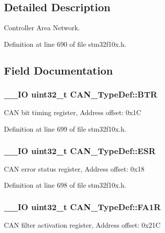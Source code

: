 \subsection{Detailed Description}
Controller Area Network. 

Definition at line 690 of file stm32f10x.\-h.



\subsection{Field Documentation}
\hypertarget{struct_c_a_n___type_def_accad1e4155459a13369f5ad0e7c6da29}{
\subsubsection[{B\-T\-R}]{\setlength{\rightskip}{0pt plus 5cm}\-\_\-\-\_\-\-I\-O {\bf uint32\-\_\-t} C\-A\-N\-\_\-\-Type\-Def\-::\-B\-T\-R}}\label{struct_c_a_n___type_def_accad1e4155459a13369f5ad0e7c6da29}
C\-A\-N bit timing register, Address offset\-: 0x1\-C 

Definition at line 699 of file stm32f10x.\-h.

\hypertarget{struct_c_a_n___type_def_ab1a1b6a7c587443a03d654d3b9a94423}{
\subsubsection[{E\-S\-R}]{\setlength{\rightskip}{0pt plus 5cm}\-\_\-\-\_\-\-I\-O {\bf uint32\-\_\-t} C\-A\-N\-\_\-\-Type\-Def\-::\-E\-S\-R}}\label{struct_c_a_n___type_def_ab1a1b6a7c587443a03d654d3b9a94423}
C\-A\-N error status register, Address offset\-: 0x18 

Definition at line 698 of file stm32f10x.\-h.

\hypertarget{struct_c_a_n___type_def_ab57a3a6c337a8c6c7cb39d0cefc2459a}{
\subsubsection[{F\-A1\-R}]{\setlength{\rightskip}{0pt plus 5cm}\-\_\-\-\_\-\-I\-O {\bf uint32\-\_\-t} C\-A\-N\-\_\-\-Type\-Def\-::\-F\-A1\-R}}\label{struct_c_a_n___type_def_ab57a3a6c337a8c6c7cb39d0cefc2459a}
C\-A\-N filter activation register, Address offset\-: 0x21\-C 

